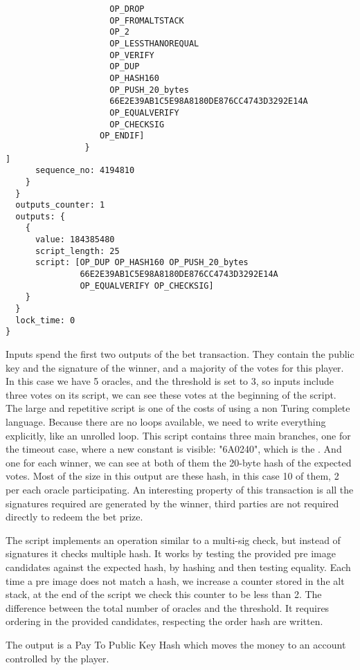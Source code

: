 \begin{lstlisting}
                     OP_DROP
                     OP_FROMALTSTACK
                     OP_2
                     OP_LESSTHANOREQUAL
                     OP_VERIFY
                     OP_DUP
                     OP_HASH160
                     OP_PUSH_20_bytes
                     66E2E39AB1C5E98A8180DE876CC4743D3292E14A
                     OP_EQUALVERIFY
                     OP_CHECKSIG
                   OP_ENDIF]
                }
]
      sequence_no: 4194810
    }
  }
  outputs_counter: 1
  outputs: {
    {
      value: 184385480
      script_length: 25
      script: [OP_DUP OP_HASH160 OP_PUSH_20_bytes
               66E2E39AB1C5E98A8180DE876CC4743D3292E14A
               OP_EQUALVERIFY OP_CHECKSIG]
    }
  }
  lock_time: 0
}
\end{lstlisting}

Inputs spend the first two outputs of the bet transaction.
They contain the public key and the signature of the winner, and a majority
  of the votes for this player.
In this case we have 5 oracles, and the threshold is set to 3, so inputs include
  three votes on its script, we can see these votes at the beginning of the
  script.
The large and repetitive script is one of the costs of using a non Turing
  complete language.
Because there are no loops available, we need to write everything explicitly,
  like an unrolled loop.
This script contains three main branches, one for the timeout case, where a new
  constant is visible: "6A0240", which is the .
And one for each winner, we can see at both of them the 20-byte hash of the
  expected votes.
Most of the size in this output are these hash, in this case 10 of them, 2 per
  each oracle participating.
An interesting property of this transaction is all the signatures required are
  generated by the winner, third parties are not required directly to redeem
  the bet prize.

The script implements an operation similar to a multi-sig check, but instead
  of signatures it checks multiple hash.
It works by testing the provided pre image candidates against the expected
  hash, by hashing and then testing equality.
Each time a pre image does not match a hash, we increase a counter stored in the
  alt stack, at the end of the script we check this counter to be less than 2.
The difference between the total number of oracles and the threshold.
It requires ordering in the provided candidates, respecting the order hash are
  written.

The output is a Pay To Public Key Hash which moves the money to an account
  controlled by the player.
